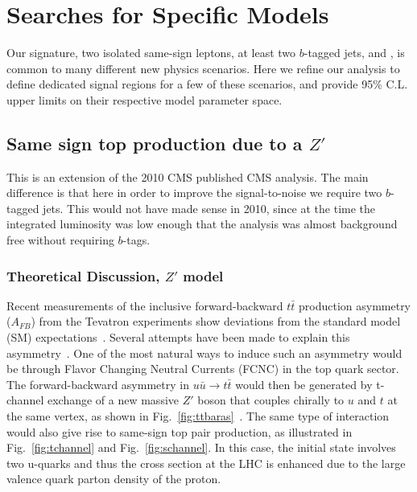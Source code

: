 \section{Searches for Specific Models}
\label{sec:stampCollecting}

Our signature, two isolated same-sign leptons, at least two $b$-tagged jets, and \met, 
is common to many different new physics scenarios.
Here we refine our analysis to define dedicated signal regions for a few of these scenarios,
and provide 95\% C.L. upper limits on their respective model parameter space.


\subsection{Same sign top production due to a $Z'$}
\label{sec:sstops}

This is an extension of the 2010 CMS published CMS analysis\cite{sstop}.
The main difference is that here in order to improve the signal-to-noise
we require two $b$-tagged jets.  This would not have made sense in 2010, since 
at the time the integrated luminosity was low enough that the analysis was almost
background free without requiring $b$-tags.

\subsubsection{Theoretical Discussion, $Z'$ model}

Recent measurements of the inclusive forward-backward $t\bar{t}$ production 
asymmetry ($A_{FB}$) from the 
Tevatron experiments show deviations from the standard model 
(SM) expectations~\cite{d0:fwtop, cdf:fwtop1, cdf:fwtop2}.
Several attempts have been made to explain this asymmetry~\cite{fcnczprime, Buckley, Gresham, zoltan}. 
One of the most natural ways to induce such an asymmetry would be through
Flavor Changing Neutral Currents (FCNC) in the top quark sector. 
The forward-backward asymmetry in $u\bar{u} \to t\bar{t}$ would then be generated
by t-channel exchange of a new massive $Z'$ boson that couples chirally to
$u$ and $t$ at the same vertex, as shown in Fig.~\ref{fig:ttbaras}~\cite{fcnczprime}.
The same type of interaction would also give rise to same-sign top pair production, 
as illustrated in Fig.~\ref{fig:tchannel} and Fig.~\ref{fig:schannel}. 
In this case, the initial state involves two u-quarks and 
thus the cross section at the LHC is enhanced due 
to the large valence quark parton density of the proton. 

